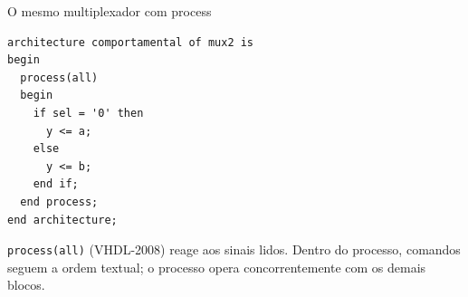 \begin{frame}[fragile,t]{O mesmo multiplexador com process}
\begin{lstlisting}
architecture comportamental of mux2 is
begin
  process(all)
  begin
    if sel = '0' then
      y <= a;
    else
      y <= b;
    end if;
  end process;
end architecture;
\end{lstlisting}\small \texttt{process(all)} (VHDL-2008) reage aos sinais lidos. Dentro do processo, comandos seguem a ordem textual; o processo opera concorrentemente com os demais blocos.
\end{frame}
